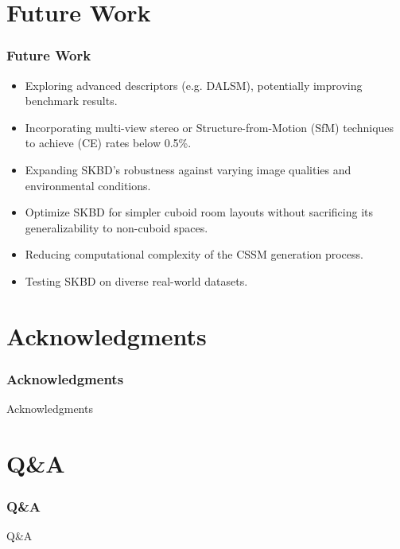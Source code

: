 \documentclass{beamer}
\begin{document}
\section{Future Work}
\begin{frame}
\frametitle{Future Work}
\begin{itemize}
    \item Exploring advanced descriptors (e.g. DALSM), potentially improving benchmark results.
    \item Incorporating multi-view stereo or Structure-from-Motion (SfM) techniques to achieve (CE) rates below 0.5\%.
    \item Expanding SKBD’s robustness against varying image qualities and environmental conditions. 
    \item Optimize SKBD for simpler cuboid room layouts without sacrificing its generalizability to non-cuboid spaces.
    \item Reducing computational complexity of the CSSM generation process.
    \item Testing SKBD on diverse real-world datasets.
\end{itemize}
\end{frame}

\section{Acknowledgments}
\begin{frame}
\frametitle{Acknowledgments}
Acknowledgments
\end{frame}

\section{Q\&A}
\begin{frame}
\frametitle{Q\&A}
Q\&A
\end{frame}
\end{document}
